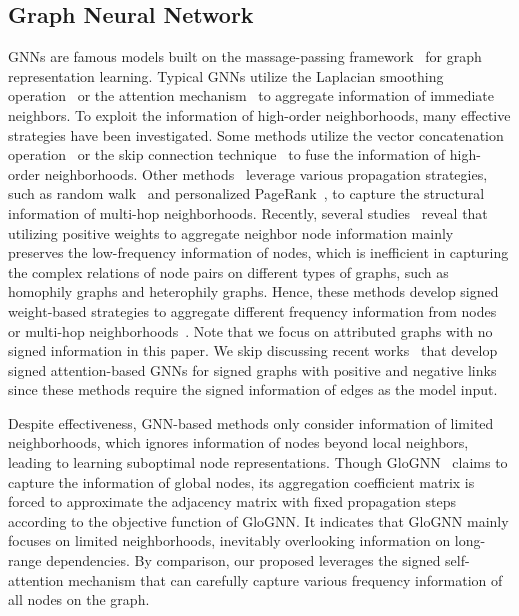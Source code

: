 \documentclass[sigconf, screen]{acmart}
\begin{document}
\subsection{Graph Neural Network}
GNNs are famous models built on the massage-passing framework~\cite{mpnn} for graph representation learning.
Typical GNNs utilize the Laplacian smoothing operation~\cite{gcn,spgcn,gcnii} or the attention mechanism~\cite{gat,amgcn,spgat} to aggregate information of immediate neighbors.
To exploit the information of high-order neighborhoods, many effective strategies have been investigated.
Some methods utilize the vector concatenation operation~\cite{mixhop} or the skip connection technique~\cite{jknet} to fuse the information of high-order neighborhoods.
Other methods~\cite{sgc,appnp,gdc} leverage various propagation strategies, such as random walk~\cite{sgc} and personalized PageRank~\cite{appnp}, to capture the structural information of multi-hop neighborhoods.
Recently, several studies~\cite{fagcn,gprgnn,glognn} reveal that utilizing positive weights to aggregate neighbor node information mainly preserves the low-frequency information of nodes, which is inefficient in capturing the complex relations of node pairs on different types of graphs, such as homophily graphs and heterophily graphs. 
Hence, these methods develop signed weight-based strategies to aggregate different frequency information from nodes~\cite{ggcn, fagcn, glognn} or multi-hop neighborhoods~\cite{gprgnn}. 
Note that we focus on attributed graphs with no signed information in this paper.
We skip discussing recent works~\cite{sigraph1,sigraph2,sigraph3} that develop signed attention-based GNNs for signed graphs with positive and negative links since these methods require the signed information of edges as the model input.

Despite effectiveness, GNN-based methods only consider information of limited neighborhoods, which ignores information of nodes beyond local neighbors, leading to learning suboptimal node representations. 
Though GloGNN~\cite{glognn} claims to capture the information of global nodes, its aggregation coefficient matrix is forced to approximate the adjacency matrix with fixed propagation steps according to the objective function of GloGNN. 
It indicates that GloGNN mainly focuses on limited neighborhoods, inevitably overlooking information on long-range dependencies.
By comparison, our proposed \name leverages the signed self-attention mechanism that can carefully capture various frequency information of all nodes on the graph.
\end{document}
